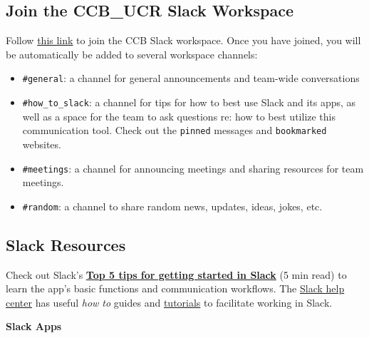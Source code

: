 \documentclass[
]{book}
\providecommand{\tightlist}{%
  \setlength{\itemsep}{0pt}\setlength{\parskip}{0pt}}
\begin{document}
\hypertarget{join-the-ccb_ucr-slack-workspace}{%
\subsection{Join the CCB\_UCR Slack Workspace}\label{join-the-ccb_ucr-slack-workspace}}

Follow \href{https://join.slack.com/t/ccbucr/shared_invite/zt-1dfpaguqs-F4CAPCI4ILMvT0JOcSpnag}{this link} to join the CCB Slack workspace. Once you have joined, you will be automatically be added to several workspace channels:

\begin{itemize}
\tightlist
\item
  \texttt{\#general}: a channel for general announcements and team-wide conversations
\item
  \texttt{\#how\_to\_slack}: a channel for tips for how to best use Slack and its apps, as well as a space for the team to ask questions re: how to best utilize this communication tool. Check out the \texttt{pinned} messages and \texttt{bookmarked} websites.
\item
  \texttt{\#meetings}: a channel for announcing meetings and sharing resources for team meetings.
\item
  \texttt{\#random}: a channel to share random news, updates, ideas, jokes, etc.
\end{itemize}

\hypertarget{slack-resources}{%
\subsection{Slack Resources}\label{slack-resources}}

Check out Slack's \href{https://slack.com/intl/en-in/resources/using-slack/top-5-tips-for-getting-started-in-slack}{\textbf{Top 5 tips for getting started in Slack}} (5 min read) to learn the app's basic functions and communication workflows. The \href{https://slack.com/help/articles/360059928654-How-to-use-Slack--your-quick-start-guide}{Slack help center} has useful \emph{how to} guides and \href{https://slack.com/help/articles/360059976673-Slack-video-tutorials}{tutorials} to facilitate working in Slack.

\textbf{Slack Apps}
\end{document}
